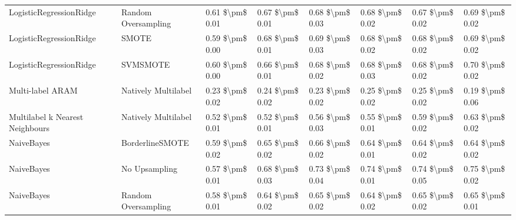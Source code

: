 \begin{tabular}{llllllll}
        LogisticRegressionRidge &           Random Oversampling & 0.61 \$\textbackslash pm\$ 0.01 &           0.67 \$\textbackslash pm\$ 0.01 &       0.68 \$\textbackslash pm\$ 0.03 &        0.68 \$\textbackslash pm\$ 0.02 &                         0.67 \$\textbackslash pm\$ 0.02 & 0.69 \$\textbackslash pm\$ 0.02 \\
        LogisticRegressionRidge &                         SMOTE & 0.59 \$\textbackslash pm\$ 0.00 &           0.68 \$\textbackslash pm\$ 0.01 &       0.69 \$\textbackslash pm\$ 0.03 &        0.68 \$\textbackslash pm\$ 0.02 &                         0.68 \$\textbackslash pm\$ 0.02 & 0.69 \$\textbackslash pm\$ 0.02 \\
        LogisticRegressionRidge &                      SVMSMOTE & 0.60 \$\textbackslash pm\$ 0.00 &           0.66 \$\textbackslash pm\$ 0.01 &       0.68 \$\textbackslash pm\$ 0.02 &        0.68 \$\textbackslash pm\$ 0.03 &                         0.68 \$\textbackslash pm\$ 0.02 & 0.70 \$\textbackslash pm\$ 0.02 \\
               Multi-label ARAM &           Natively Multilabel & 0.23 \$\textbackslash pm\$ 0.02 &           0.24 \$\textbackslash pm\$ 0.02 &       0.23 \$\textbackslash pm\$ 0.02 &        0.25 \$\textbackslash pm\$ 0.02 &                         0.25 \$\textbackslash pm\$ 0.02 & 0.19 \$\textbackslash pm\$ 0.06 \\
Multilabel k Nearest Neighbours &           Natively Multilabel & 0.52 \$\textbackslash pm\$ 0.01 &           0.52 \$\textbackslash pm\$ 0.01 &       0.56 \$\textbackslash pm\$ 0.03 &        0.55 \$\textbackslash pm\$ 0.01 &                         0.59 \$\textbackslash pm\$ 0.02 & 0.63 \$\textbackslash pm\$ 0.02 \\
                     NaiveBayes &               BorderlineSMOTE & 0.59 \$\textbackslash pm\$ 0.02 &           0.65 \$\textbackslash pm\$ 0.02 &       0.66 \$\textbackslash pm\$ 0.02 &        0.64 \$\textbackslash pm\$ 0.01 &                         0.64 \$\textbackslash pm\$ 0.02 & 0.64 \$\textbackslash pm\$ 0.02 \\
                     NaiveBayes &                 No Upsampling & 0.57 \$\textbackslash pm\$ 0.01 &           0.68 \$\textbackslash pm\$ 0.03 &       0.73 \$\textbackslash pm\$ 0.04 &        0.74 \$\textbackslash pm\$ 0.01 &                         0.74 \$\textbackslash pm\$ 0.05 & 0.75 \$\textbackslash pm\$ 0.02 \\
                     NaiveBayes &           Random Oversampling & 0.58 \$\textbackslash pm\$ 0.01 &           0.64 \$\textbackslash pm\$ 0.02 &       0.65 \$\textbackslash pm\$ 0.02 &        0.64 \$\textbackslash pm\$ 0.02 &                         0.65 \$\textbackslash pm\$ 0.02 & 0.65 \$\textbackslash pm\$ 0.01 \\

\end{tabular}
